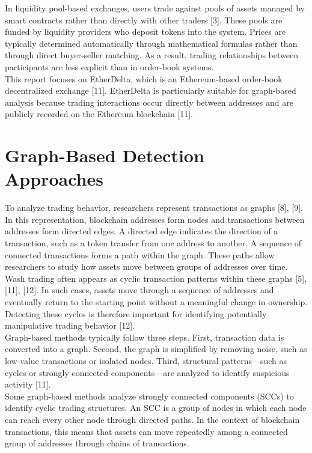 \documentclass[language=english,thesis=bachelor,nosecondtitle,faculty=cb,onesided,12pt]{hsmw-thesis}
\begin{document}
In liquidity pool-based exchanges, users trade against pools of assets managed by smart contracts rather than directly with other traders [3]. These pools are funded by liquidity providers who deposit tokens into the system. Prices are typically determined automatically through mathematical formulas rather than through direct buyer-seller matching. As a result, trading relationships between participants are less explicit than in order-book systems.\\
This report focuses on EtherDelta, which is an Ethereum-based order-book decentralized exchange [11]. EtherDelta is particularly suitable for graph-based analysis because trading interactions occur directly between addresses and are publicly recorded on the Ethereum blockchain [11].

	\section{Graph-Based Detection Approaches}
To analyze trading behavior, researchers represent transactions as graphs [8], [9]. In this representation, blockchain addresses form nodes and transactions between addresses form directed edges. A directed edge indicates the direction of a transaction, such as a token transfer from one address to another. A sequence of connected transactions forms a path within the graph. These paths allow researchers to study how assets move between groups of addresses over time.\\
Wash trading often appears as cyclic transaction patterns within these graphs [5], [11], [12]. In such cases, assets move through a sequence of addresses and eventually return to the starting point without a meaningful change in ownership. Detecting these cycles is therefore important for identifying potentially manipulative trading behavior [12].\\
Graph-based methods typically follow three steps. First, transaction data is converted into a graph. Second, the graph is simplified by removing noise, such as low-value transactions or isolated nodes. Third, structural patterns—such as cycles or strongly connected components—are analyzed to identify suspicious activity [11].\\
Some graph-based methods analyze strongly connected components (SCCs) to identify cyclic trading structures. An SCC is a group of nodes in which each node can reach every other node through directed paths. In the context of blockchain transactions, this means that assets can move repeatedly among a connected group of addresses through chains of transactions.\\
\end{document}
